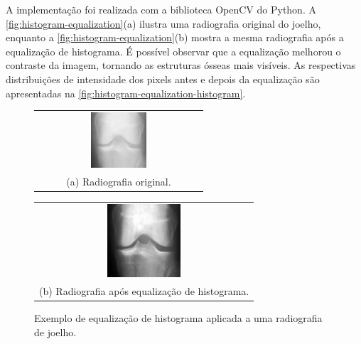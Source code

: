 A implementação foi realizada com a biblioteca OpenCV \cite{opencv} do Python. A \autoref{fig:histogram-equalization}(a) ilustra uma radiografia original do joelho, enquanto a \autoref{fig:histogram-equalization}(b) mostra a mesma radiografia após a equalização de histograma. É possível observar que a equalização melhorou o contraste da imagem, tornando as estruturas ósseas mais visíveis. As respectivas distribuições de intensidade dos pixels antes e depois da equalização são apresentadas na \autoref{fig:histogram-equalization-histogram}.

\begin{figure}[!htbp]
    \centering
    \begin{tabular}{@{}c@{}}
        \includegraphics[width=0.35\textwidth]{figs/imagem-nao-equalizada.png} \\[\abovecaptionskip]
        \small (a) Radiografia original.
    \end{tabular}
    \hfill
    \begin{tabular}{@{}c@{}}
        \includegraphics[width=0.35\textwidth]{figs/image-equalizada.png} \\[\abovecaptionskip]
        \small (b) Radiografia após equalização de histograma.
    \end{tabular}
    \caption{Exemplo de equalização de histograma aplicada a uma radiografia de joelho.}
    \label{fig:histogram-equalization}
\end{figure}


